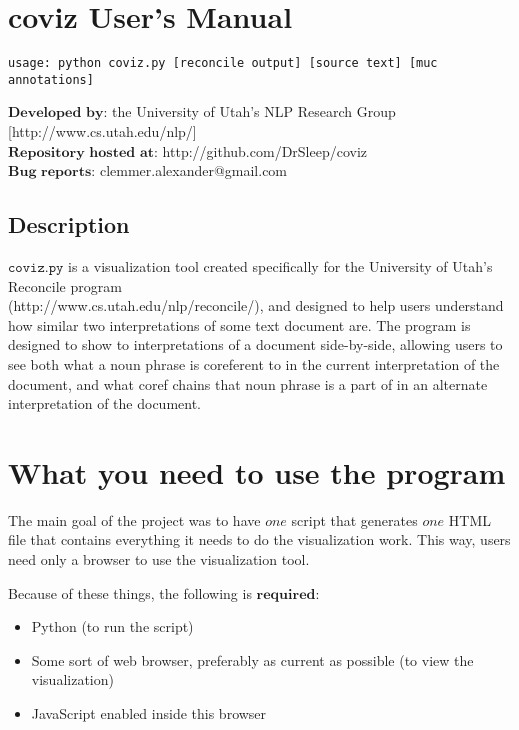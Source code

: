 \documentclass[a4paper]{article}
\begin{document}
\section*{coviz User's Manual}
\begin{verbatim}
usage: python coviz.py [reconcile output] [source text] [muc annotations]
\end{verbatim}

\noindent $\textbf{Developed by:}$ the University of Utah's NLP Research Group [http://www.cs.utah.edu/nlp/] \\
\noindent $\textbf{Repository hosted at:}$ http://github.com/DrSleep/coviz \\
\noindent $\textbf{Bug reports:}$ clemmer.alexander@gmail.com

\subsection*{Description}
$\texttt{coviz.py}$ is a visualization tool created specifically for the University of Utah's Reconcile program \\
(http://www.cs.utah.edu/nlp/reconcile/), and designed to help users understand how similar two interpretations of some text document are. The program is designed to show to interpretations of a document side-by-side, allowing users to see both what a noun phrase is coreferent to in the current interpretation of the document, and what coref chains that noun phrase is a part of in an alternate interpretation of the document.

\section{What you need to use the program}

The main goal of the project was to have $\textit{one}$ script that generates $\textit{one}$ HTML file that contains everything it needs to do the visualization work. This way, users need only a browser to use the visualization tool.

Because of these things, the following is $\textbf{required}$:

\begin{itemize}
\item Python (to run the script)
\item Some sort of web browser, preferably as current as possible (to view the visualization)
\item JavaScript enabled inside this browser
\end{itemize}
\end{document}
